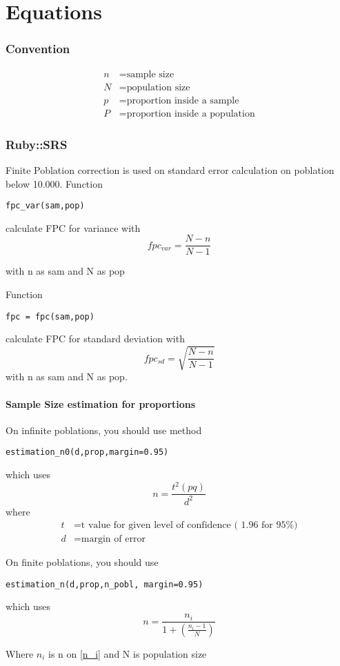 \part{Equations}
\section{Convention}
\begin{align*}
n &= \text{sample size}\\
N &= \text{population size}\\
p &= \text{proportion inside a sample}\\
P &= \text{proportion inside a population}
\end{align*}
\section{Ruby::SRS}
Finite Poblation correction is used on standard error calculation on poblation below 10.000. Function 
\begin{verbatim}
fpc_var(sam,pop)
\end{verbatim}
calculate FPC for variance with
\begin{equation}
fpc_{var} = \frac{N-n} {N-1}
\end{equation}

with n  as sam and N as pop

Function 
\begin{verbatim}
fpc = fpc(sam,pop)
\end{verbatim}

calculate FPC for standard deviation with 
\begin{equation}
fpc_{sd} = \sqrt{\frac{N-n} {N-1}}
\label{fpc}
\end{equation}
with n  as sam and N as pop.

\subsection{Sample Size estimation for proportions}

On infinite poblations, you should use method
\begin{verbatim}
estimation_n0(d,prop,margin=0.95)
\end{verbatim}
which uses
\begin{equation}
n = \frac{t^2(pq)}{d^2}
\label{n_i}
\end{equation}
where
\begin{align*}
t &= \text{t value for given level of confidence ( 1.96 for 95\% )}\\
d &= \text{margin of error}
\end{align*}

On finite poblations, you should use
\begin{verbatim}
estimation_n(d,prop,n_pobl, margin=0.95)
\end{verbatim}
which uses
\begin{equation}
n = \frac{n_i}{1+(\frac{n_i-1}{N})}
\end{equation}

Where $n_i$ is n on \ref{n_i} and N is population size


